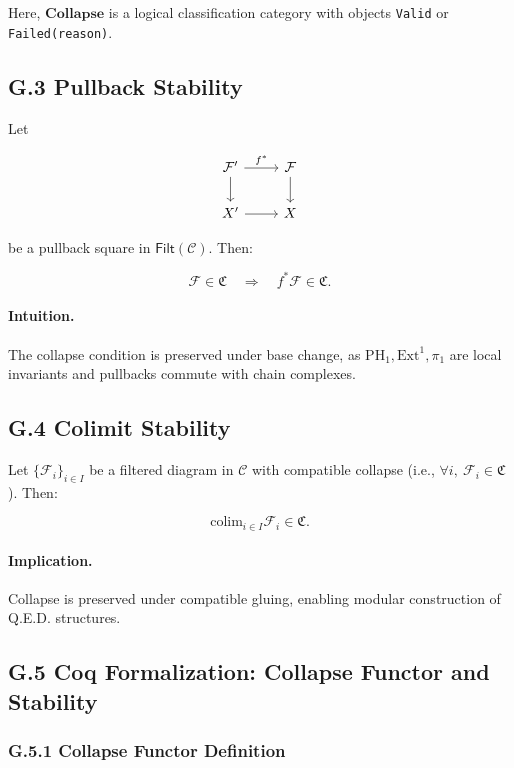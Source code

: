 \documentclass[11pt]{article}
\begin{document}
Here, \( \mathbf{Collapse} \) is a logical classification category with objects \texttt{Valid} or \texttt{Failed(reason)}.

\subsection*{G.3 Pullback Stability}

Let

\[
\begin{tikzcd}
\mathcal{F}' \arrow[r, "f^*"] \arrow[d] & \mathcal{F} \arrow[d] \\
X' \arrow[r] & X
\end{tikzcd}
\]

be a pullback square in \( \mathsf{Filt}(\mathcal{C}) \). Then:

\[
\mathcal{F} \in \mathfrak{C} \quad \Rightarrow \quad f^*\mathcal{F} \in \mathfrak{C}.
\]

\paragraph{Intuition.}  
The collapse condition is preserved under base change, as \( \mathrm{PH}_1, \mathrm{Ext}^1, \pi_1 \) are local invariants and pullbacks commute with chain complexes.

\subsection*{G.4 Colimit Stability}

Let \( \{ \mathcal{F}_i \}_{i \in I} \) be a filtered diagram in \( \mathcal{C} \) with compatible collapse (i.e., \( \forall i,\ \mathcal{F}_i \in \mathfrak{C} \)). Then:

\[
\mathrm{colim}_{i \in I} \mathcal{F}_i \in \mathfrak{C}.
\]

\paragraph{Implication.}  
Collapse is preserved under compatible gluing, enabling modular construction of Q.E.D. structures.

\subsection*{G.5 Coq Formalization: Collapse Functor and Stability}

\subsubsection*{G.5.1 Collapse Functor Definition}
\end{document}
